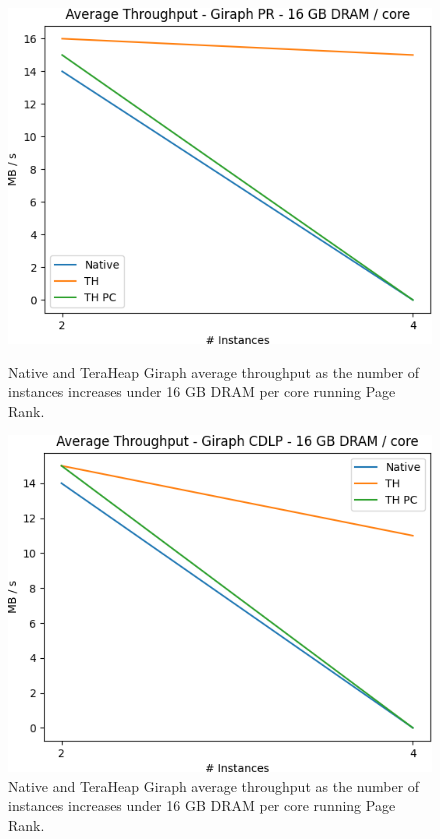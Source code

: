 \begin{figure}[thbp]
        \centering
        \includegraphics[width=\linewidth]{./fig/G_PR_128_THR.png}
    \caption{Native and TeraHeap Giraph average throughput
        as the number of instances increases under 16 GB DRAM per core running Page Rank.}
        \label{fig:g_pr128_thr}
        \includegraphics[width=\linewidth]{./fig/G_CDLP_128_THR.png}
    \caption{Native and TeraHeap Giraph average throughput
        as the number of instances increases under 16 GB DRAM per core running Page Rank.}
        \label{fig:g_cdlp128_thr}
\end{figure}


